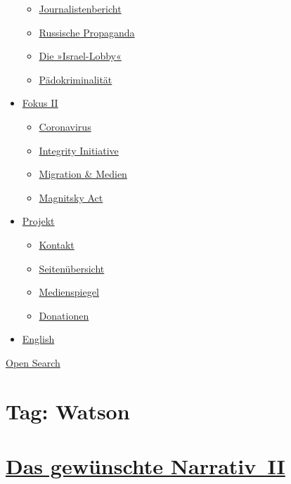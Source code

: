 \begin{itemize}
  \begin{itemize}
  \tightlist
  \item
    \href{https://swprs.org/bericht-eines-journalisten/}{Journalistenbericht}
  \item
    \href{https://swprs.org/russische-propaganda/}{Russische Propaganda}
  \item
    \href{https://swprs.org/die-israel-lobby-fakten-und-mythen/}{Die
    »Israel-Lobby«}
  \item
    \href{https://swprs.org/geopolitik-und-paedokriminalitaet/}{Pädokriminalität}
  \end{itemize}
\item
  \href{https://swprs.org/migration-und-medien/}{Fokus II}

  \begin{itemize}
  \tightlist
  \item
    \href{https://swprs.org/covid-19-hinweis-ii/}{Coronavirus}
  \item
    \href{https://swprs.org/die-integrity-initiative/}{Integrity
    Initiative}
  \item
    \href{https://swprs.org/migration-und-medien/}{Migration \& Medien}
  \item
    \href{https://swprs.org/der-fall-magnitsky/}{Magnitsky Act}
  \end{itemize}
\item
  \href{https://swprs.org/kontakt/}{Projekt}

  \begin{itemize}
  \tightlist
  \item
    \href{https://swprs.org/kontakt/}{Kontakt}
  \item
    \href{https://swprs.org/uebersicht/}{Seitenübersicht}
  \item
    \href{https://swprs.org/medienspiegel/}{Medienspiegel}
  \item
    \href{https://swprs.org/donationen/}{Donationen}
  \end{itemize}
\item
  \href{https://swprs.org/contact/}{English}
\end{itemize}

\protect\hyperlink{}{Open Search}

\hypertarget{tag-watson}{%
\section{Tag: Watson}\label{tag-watson}}

\hypertarget{das-gewuxfcnschte-narrativ-ii}{%
\section{\texorpdfstring{\href{https://swprs.org/2017/03/01/das-gewuenschte-narrativ-ii/}{Das
gewünschte
Narrativ~II}}{Das gewünschte Narrativ~II}}\label{das-gewuxfcnschte-narrativ-ii}}

